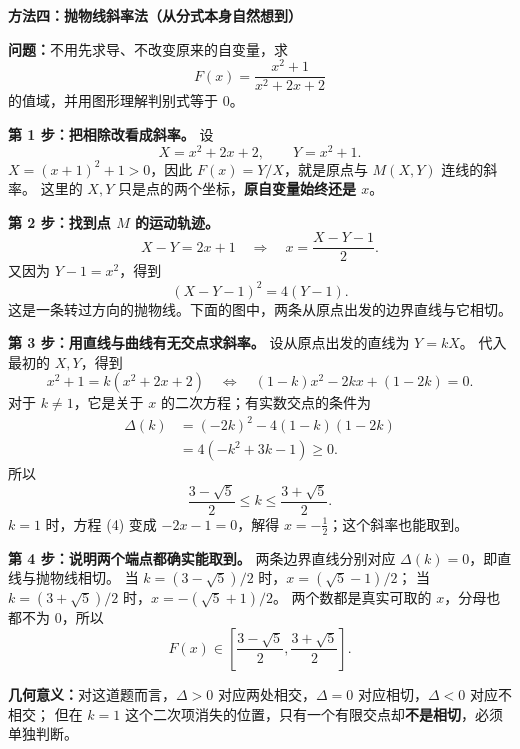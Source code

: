 \clearpage
\begin{proofbox}
  \textbf{\textcolor{CProof}{方法四：抛物线斜率法（从分式本身自然想到）}}

  \medskip
  \textbf{问题：}不用先求导、不改变原来的自变量，求
  \[
    F(x)=\frac{x^2+1}{x^2+2x+2}
  \]
  的值域，并用图形理解判别式等于 $0$。

  \textbf{第 1 步：把相除改看成斜率。}
  设
  \[
    X=x^2+2x+2,\qquad Y=x^2+1.
  \]
  $X=(x+1)^2+1>0$，因此 $F(x)=Y/X$，就是原点与 $M(X,Y)$ 连线的斜率。
  这里的 $X,Y$ 只是点的两个坐标，\textbf{原自变量始终还是 $x$}。

  \textbf{第 2 步：找到点 $M$ 的运动轨迹。}
  \[
    X-Y=2x+1\quad\Longrightarrow\quad x=\frac{X-Y-1}{2}.
  \]
  又因为 $Y-1=x^2$，得到
  \[
    \boxed{(X-Y-1)^2=4(Y-1).}
  \]
  这是一条转过方向的抛物线。下面的图中，两条从原点出发的边界直线与它相切。
  \begin{center}\end{center}

  \textbf{第 3 步：用直线与曲线有无交点求斜率。}
  设从原点出发的直线为 $Y=kX$。
  代入最初的 $X,Y$，得到
  \[
    x^2+1=k(x^2+2x+2)
    \quad\Longleftrightarrow\quad
    (1-k)x^2-2kx+(1-2k)=0. \tag{4}
  \]
  对于 $k\ne1$，它是关于 $x$ 的二次方程；有实数交点的条件为
  \[
    \begin{aligned}
      \Delta(k)&=(-2k)^2-4(1-k)(1-2k)\\
      &=4(-k^2+3k-1)\ge0.
    \end{aligned}
  \]
  所以
  \[
    \boxed{\frac{3-\sqrt5}{2}\le k\le\frac{3+\sqrt5}{2}.}
  \]
  $k=1$ 时，方程 (4) 变成 $-2x-1=0$，解得 $x=-\frac12$；这个斜率也能取到。

  \textbf{第 4 步：说明两个端点都确实能取到。}
  两条边界直线分别对应 $\Delta(k)=0$，即直线与抛物线相切。
  当 $k=(3-\sqrt5)/2$ 时，$x=(\sqrt5-1)/2$；
  当 $k=(3+\sqrt5)/2$ 时，$x=-(\sqrt5+1)/2$。
  两个数都是真实可取的 $x$，分母也都不为 $0$，所以
  \[
    \boxed{F(x)\in\left[\frac{3-\sqrt5}{2},\frac{3+\sqrt5}{2}\right].}
  \]

  \textbf{几何意义：}对这道题而言，$\Delta>0$ 对应两处相交，$\Delta=0$ 对应相切，$\Delta<0$ 对应不相交；
  但在 $k=1$ 这个二次项消失的位置，只有一个有限交点却\textbf{不是相切}，必须单独判断。
\end{proofbox}

